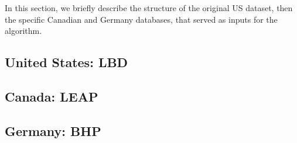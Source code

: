 
In this section, we briefly describe the structure of the original US dataset, then the specific Canadian and Germany databases, that served as inputs for the algorithm.

\subsection{United States: \acf{LBD}}



\subsection{Canada: \acf{LEAP}}



\subsection{Germany: \ac{BHP}}



